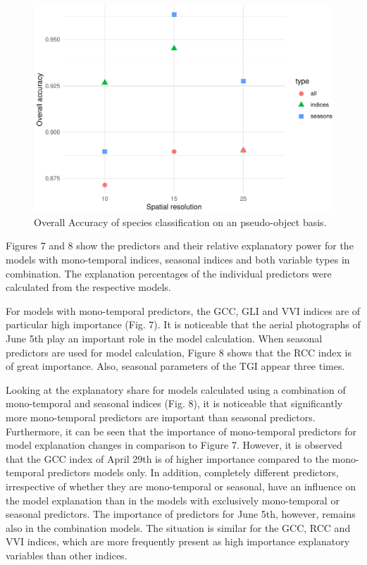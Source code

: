 \documentclass[]{article}
\begin{document}
\begin{figure}[H]

{\centering \includegraphics[width=0.8\linewidth]{report_files/figure-latex/validation_plots-1} 

}

\caption{Overall Accuracy of species classification on an pseudo-object basis.}\label{fig:validation_plots}
\end{figure}

Figures 7 and 8 show the predictors and their relative explanatory power
for the models with mono-temporal indices, seasonal indices and both
variable types in combination. The explanation percentages of the
individual predictors were calculated from the respective models.

For models with mono-temporal predictors, the GCC, GLI and VVI indices
are of particular high importance (Fig. 7). It is noticeable that the
aerial photographs of June 5th play an important role in the model
calculation. When seasonal predictors are used for model calculation,
Figure 8 shows that the RCC index is of great importance. Also, seasonal
parameters of the TGI appear three times.

Looking at the explanatory share for models calculated using a
combination of mono-temporal and seasonal indices (Fig. 8), it is
noticeable that significantly more mono-temporal predictors are
important than seasonal predictors. Furthermore, it can be seen that the
importance of mono-temporal predictors for model explanation changes in
comparison to Figure 7. However, it is observed that the GCC index of
April 29th is of higher importance compared to the mono-temporal
predictors models only. In addition, completely different predictors,
irrespective of whether they are mono-temporal or seasonal, have an
influence on the model explanation than in the models with exclusively
mono-temporal or seasonal predictors. The importance of predictors for
June 5th, however, remains also in the combination models. The situation
is similar for the GCC, RCC and VVI indices, which are more frequently
present as high importance explanatory variables than other indices.
\end{document}
